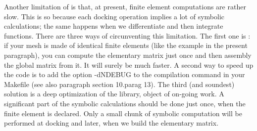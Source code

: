 Another limitation of {\maniFEM} is that, at present, finite element computations
are rather slow.
This is so because each docking operation implies a lot of symbolic calculations;
the same happens when we differentiate and then integrate functions.
There are three ways of circunventing this limitation.
The first one is : if your mesh is made of identical finite elements
(like the example in the present paragraph), you can compute the elementary matrix
just once and then assembly the global matrix from it.
It will surely be much faster.
A second way to speed up the code is to add the option {\codett -dNDEBUG} to the compilation
command in your {\codett Makefile} (see also paragraph \numb section 10.\numb parag 13).
The third (and soundest) solution is a deep optimization of the {\maniFEM} library,
object of on-going work.
A significant part of the symbolic calculations should be done just once,
when the finite element is declared.
Only a small chunk of symbolic computation will be performed at docking and
later, when we build the elementary matrix.

